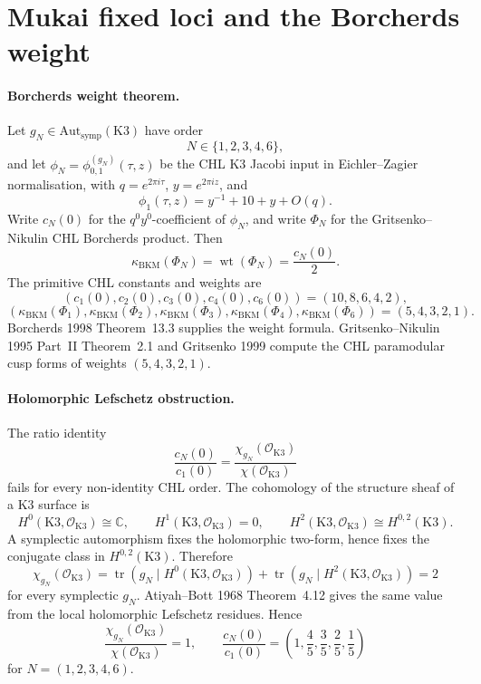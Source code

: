 \section{Mukai fixed loci and the Borcherds weight}
\label{sec:mukai-fixed-loci-borcherds-weight}

\providecommand{\cO}{\mathcal{O}}
\providecommand{\K}{\mathrm{K3}}
\providecommand{\Fix}{\mathrm{Fix}}
\providecommand{\Aut}{\mathrm{Aut}}
\providecommand{\symp}{\mathrm{symp}}

\paragraph{Borcherds weight theorem.}
Let \(g_N\in\Aut_{\symp}(\K)\) have order
\[
  N\in\{1,2,3,4,6\},
\]
and let \(\phi_N=\phi^{(g_N)}_{0,1}(\tau,z)\) be the CHL K3 Jacobi
input in Eichler--Zagier normalisation, with
\(q=e^{2\pi i\tau}\), \(y=e^{2\pi iz}\), and
\[
  \phi_1(\tau,z)=y^{-1}+10+y+O(q).
\]
Write \(c_N(0)\) for the \(q^0y^0\)-coefficient of \(\phi_N\), and
write \(\Phi_N\) for the Gritsenko--Nikulin CHL Borcherds product. Then
\[
  \kappa_{\mathrm{BKM}}(\Phi_N)
  =
  \operatorname{wt}(\Phi_N)
  =
  \frac{c_N(0)}{2}.
\]
The primitive CHL constants and weights are
\[
  (c_1(0),c_2(0),c_3(0),c_4(0),c_6(0))
  =
  (10,8,6,4,2),
\]
\[
  (\kappa_{\mathrm{BKM}}(\Phi_1),
   \kappa_{\mathrm{BKM}}(\Phi_2),
   \kappa_{\mathrm{BKM}}(\Phi_3),
   \kappa_{\mathrm{BKM}}(\Phi_4),
   \kappa_{\mathrm{BKM}}(\Phi_6))
  =
  (5,4,3,2,1).
\]
Borcherds 1998 Theorem~13.3 supplies the weight formula.
Gritsenko--Nikulin 1995 Part~II Theorem~2.1 and Gritsenko 1999 compute
the CHL paramodular cusp forms of weights \((5,4,3,2,1)\).

\paragraph{Holomorphic Lefschetz obstruction.}
The ratio identity
\[
  \frac{c_N(0)}{c_1(0)}
  =
  \frac{\chi_{g_N}(\cO_\K)}{\chi(\cO_\K)}
\]
fails for every non-identity CHL order. The cohomology of the structure
sheaf of a K3 surface is
\[
  H^0(\K,\cO_\K)\cong\mathbb C,\qquad
  H^1(\K,\cO_\K)=0,\qquad
  H^2(\K,\cO_\K)\cong H^{0,2}(\K).
\]
A symplectic automorphism fixes the holomorphic two-form, hence fixes
the conjugate class in \(H^{0,2}(\K)\). Therefore
\[
  \chi_{g_N}(\cO_\K)
  =
  \operatorname{tr}\!\left(g_N\mid H^0(\K,\cO_\K)\right)
  +
  \operatorname{tr}\!\left(g_N\mid H^2(\K,\cO_\K)\right)
  =
  2
\]
for every symplectic \(g_N\). Atiyah--Bott 1968 Theorem~4.12 gives the
same value from the local holomorphic Lefschetz residues. Hence
\[
  \frac{\chi_{g_N}(\cO_\K)}{\chi(\cO_\K)}=1,
  \qquad
  \frac{c_N(0)}{c_1(0)}
  =
  \left(1,\frac45,\frac35,\frac25,\frac15\right)
\]
for \(N=(1,2,3,4,6)\).

